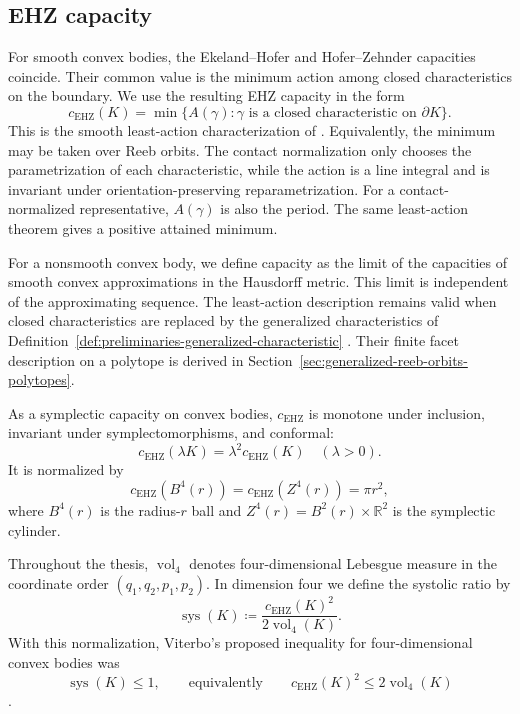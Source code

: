 \subsection{EHZ capacity}\label{subsec:preliminaries-smooth-symplectic-geometry}

For smooth convex bodies, the Ekeland--Hofer and Hofer--Zehnder capacities
coincide. Their common value is the minimum action among closed
characteristics on the boundary. We use the resulting EHZ capacity in
the form
\begin{equation}\label{eq:preliminaries-ehz-capacity}
  c_{\mathrm{EHZ}}(K)
  = \min\{A(\gamma):\gamma
    \text{ is a closed characteristic on }\partial K\}.
\end{equation}
This is the smooth least-action characterization of
\cite[Theorem~2.2]{AAO2014}.
Equivalently, the minimum may be taken over Reeb orbits. The contact
normalization only chooses the parametrization of each characteristic, while
the action is a line integral and is invariant under orientation-preserving
reparametrization. For a contact-normalized representative, \(A(\gamma)\) is
also the period. The same least-action theorem gives a positive attained
minimum.

For a nonsmooth convex body, we define capacity as the limit of the
capacities of smooth convex approximations in the Hausdorff metric. This
limit is independent of the approximating sequence. The least-action
description remains valid when closed characteristics are replaced by the
generalized characteristics of
Definition~\ref{def:preliminaries-generalized-characteristic}
\cite[Proposition~2.7]{AAO2014}. Their finite
facet description on a polytope is derived in
Section~\ref{sec:generalized-reeb-orbits-polytopes}.

As a symplectic capacity on convex bodies, \(c_{\mathrm{EHZ}}\) is monotone
under inclusion, invariant under symplectomorphisms, and conformal:
\[
  c_{\mathrm{EHZ}}(\lambda K)=\lambda^2c_{\mathrm{EHZ}}(K)
  \quad(\lambda>0).
\]
It is normalized by
\[
  c_{\mathrm{EHZ}}(B^4(r))=c_{\mathrm{EHZ}}(Z^4(r))=\pi r^2,
\]
where \(B^4(r)\) is the radius-\(r\) ball and
\(Z^4(r)=B^2(r)\times\mathbb{R}^2\) is the symplectic cylinder.

Throughout the thesis, \(\operatorname{vol}_4\) denotes four-dimensional
Lebesgue measure in the coordinate order \((q_1,q_2,p_1,p_2)\). In dimension
four we define the systolic ratio by
\begin{equation}\label{eq:preliminaries-systolic-ratio}
  \operatorname{sys}(K)
  \coloneqq
  \frac{c_{\mathrm{EHZ}}(K)^2}{2\operatorname{vol}_4(K)}.
\end{equation}
With this normalization, Viterbo's proposed inequality for four-dimensional convex
bodies was
\[
  \operatorname{sys}(K)\leq 1,
  \qquad\text{equivalently}\qquad
  c_{\mathrm{EHZ}}(K)^2\leq 2\operatorname{vol}_4(K)
\]
\cite{Viterbo2000}.

